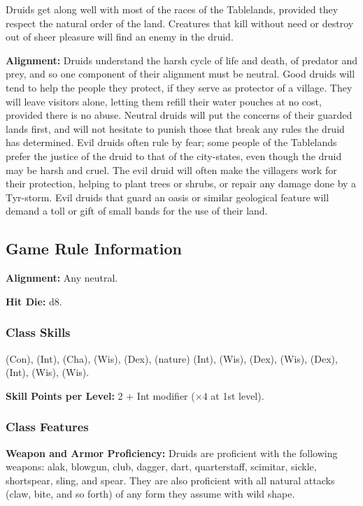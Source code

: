 Druids get along well with most of the races of the Tablelands, provided they respect the natural order of the land. Creatures that kill without need or destroy out of sheer pleasure will find an enemy in the druid.

\textbf{Alignment:} Druids understand the harsh cycle of life and death, of predator and prey, and so one component of their alignment must be neutral. Good druids will tend to help the people they protect, if they serve as protector of a village. They will leave visitors alone, letting them refill their water pouches at no cost, provided there is no abuse. Neutral druids will put the concerns of their guarded lands first, and will not hesitate to punish those that break any rules the druid has determined. Evil druids often rule by fear; some people of the Tablelands prefer the justice of the druid to that of the city-states, even though the druid may be harsh and cruel. The evil druid will often make the villagers work for their protection, helping to plant trees or shrubs, or repair any damage done by a Tyr-storm. Evil druids that guard an oasis or similar geological feature will demand a toll or gift of small bands for the use of their land.

\subsection{Game Rule Information}
\textbf{Alignment:} Any neutral.

\textbf{Hit Die:} d8.

\subsubsection{Class Skills}
 (Con),  (Int),  (Cha),  (Wis),  (Dex),  (nature) (Int),  (Wis),  (Dex),  (Wis),  (Dex),  (Int),  (Wis),  (Wis).

\textbf{Skill Points per Level:} 2 + Int modifier ($\times4$ at 1st level).


\subsubsection{Class Features}
\textbf{Weapon and Armor Proficiency:} Druids are proficient with the following weapons: alak, blowgun, club, dagger, dart, quarterstaff, scimitar, sickle, shortspear, sling, and spear. They are also proficient with all natural attacks (claw, bite, and so forth) of any form they assume with wild shape.


